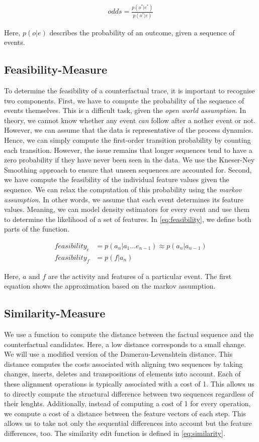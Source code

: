 \documentclass[./../../paper.tex]{subfiles}
\begin{document}
\begin{align}
    \label{eq:likelihood}
    odds = \frac{p(o^*|e^*)}{p(o^*|e)}
\end{align}

Here, $p(o|e)$ describes the probability of an outcome, given a sequence of events.

\subsection{Feasibility-Measure}
To determine the feasibility of a counterfactual trace, it is important to recognise two components. First, we have to compute the probability of the sequence of events themselves. This is a difficult task, given the \emph{open world assumption}. In theory, we cannot know whether any event \emph{can} follow after a nother event or not. However, we can assume that the data is representative of the process dynamics. Hence, we can simply compute the first-order transition probability by counting each transition. However, the issue remains that longer sequences tend to have a zero probability if they have never been seen in the data. We use the Kneser-Ney Smoothing\needscite{} approach to ensure that unseen sequences are accounted for. Second, we have compute the feasibility of the individual feature values given the sequence. We can relax the computation of this probability using the \emph{markov assumption}. In other words, we assume that each event determines its feature values. Meaning, we can model density estimators for every event and use them to determine the likelihood of a set of features. In \autoref{eq:feasibility}, we define both parts of the function.

\begin{align}
    \label{eq:feasibility}
    feasibility_e & =p(a_n|a_1\ldots e_{n-1}) \approx  p(a_n|a_{n-1}) \\
    feasibility_f & =p(f|a_n)
\end{align}

\noindent Here, $a \text{ and } f$ are the activity and features of a particular event. The first equation shows the approximation based on the markov assumption.

\subsection{Similarity-Measure}
We use a function to compute the distance between the factual sequence and the counterfactual candidates. Here, a low distance corresponds to a small change. We will use a modified version of the Damerau-Levenshtein distance. This distance computes the costs associated with aligning two sequences by taking changes, inserts, deletes and transpositions of elements into account. Each of these alignment operations is typically associated with a cost of 1. This allows us to directly compute the structural difference between two sequences regardless of their lenghts. Additionally, instead of computing a cost of 1 for every operation, we compute a cost of a distance between the feature vectors of each step. This allows us to take not only the sequential differences into account but the feature differences, too. The similarity edit function is defined in \autoref{eq:similarity}.
\end{document}
